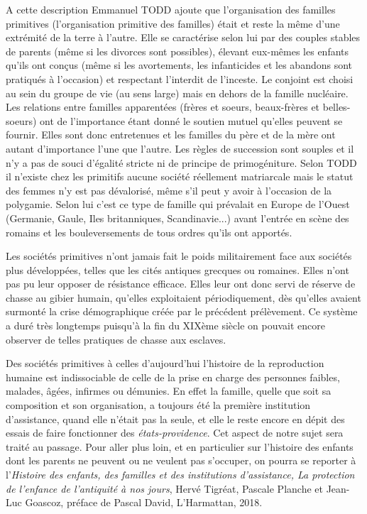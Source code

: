 A cette description Emmanuel TODD ajoute que l'organisation des familles primitives (l'organisation primitive des familles) était et reste la même d'une extrémité de la terre à l'autre. Elle se caractérise selon lui par des couples stables de parents (même si les divorces sont possibles), élevant eux-mêmes les enfants qu'ils ont conçus (même si les avortements, les infanticides et les abandons sont pratiqués à l'occasion) et respectant l'interdit de l'inceste. Le conjoint est choisi au sein du groupe de vie (au sens large) mais en dehors de la famille nucléaire. Les relations entre familles apparentées (frères et soeurs, beaux-frères et belles-soeurs) ont de l'importance étant donné le soutien mutuel qu'elles peuvent se fournir. Elles sont donc entretenues et les familles du père et de la mère ont autant d'importance l'une que l'autre. Les règles de succession sont souples et il n'y a pas de souci d'égalité stricte ni de principe de primogéniture. Selon TODD il n'existe chez les primitifs aucune société réellement matriarcale mais le statut des femmes n'y est pas dévalorisé, même s'il peut y avoir à l'occasion de la polygamie. Selon lui c'est ce type de famille qui prévalait en Europe de l'Ouest (Germanie, Gaule, Iles britanniques, Scandinavie...) avant l'entrée en scène des romains et les bouleversements de tous ordres qu'ils ont apportés. 



Les sociétés primitives n'ont jamais fait le poids militairement face aux sociétés plus développées, telles que les cités antiques grecques ou romaines. Elles n'ont pas pu leur opposer de résistance efficace. Elles leur ont donc servi de réserve de chasse au gibier humain, qu'elles exploitaient périodiquement, dès qu'elles avaient surmonté la crise démographique créée par le précédent prélèvement.  Ce système a duré très longtemps puisqu'à la fin du XIXème siècle on pouvait encore observer de telles pratiques de chasse aux esclaves.


Des sociétés primitives à celles d'aujourd’hui l'histoire de la reproduction humaine est indissociable de celle de la prise en charge des personnes faibles, malades, âgées, infirmes ou démunies. En effet la famille, quelle que soit sa composition et son organisation, a toujours été la première institution d'assistance, quand elle n'était pas la seule, et elle le reste encore en dépit des essais de faire fonctionner des \emph{états-providence}. Cet aspect de notre sujet sera traité au passage. Pour aller plus loin, et en particulier sur l'histoire des enfants dont les parents ne peuvent ou ne veulent pas s'occuper, on pourra se reporter à l'\emph{Histoire des enfants, des familles et des institutions d'assistance, La protection de l'enfance de l'antiquité à nos jours}, Hervé Tigréat, Pascale Planche et Jean-Luc Goascoz, préface de Pascal David, L'Harmattan, 2018.

